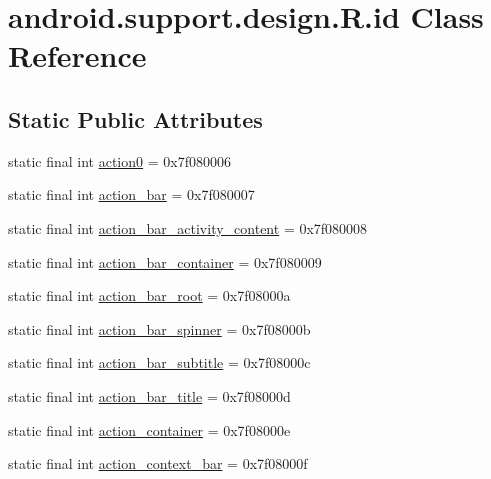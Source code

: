 \hypertarget{classandroid_1_1support_1_1design_1_1_r_1_1id}{}\section{android.\+support.\+design.\+R.\+id Class Reference}
\label{classandroid_1_1support_1_1design_1_1_r_1_1id}
\subsection*{Static Public Attributes}
\begin{DoxyCompactItemize}
\item 
static final int \mbox{\hyperlink{classandroid_1_1support_1_1design_1_1_r_1_1id_a65ca78d6559d5c73324d48f61d2af87e}{action0}} = 0x7f080006
\item 
static final int \mbox{\hyperlink{classandroid_1_1support_1_1design_1_1_r_1_1id_a244052aff1f9058e9de1c6c346d3843e}{action\+\_\+bar}} = 0x7f080007
\item 
static final int \mbox{\hyperlink{classandroid_1_1support_1_1design_1_1_r_1_1id_ad64ccac77799d29737c02c55d580556d}{action\+\_\+bar\+\_\+activity\+\_\+content}} = 0x7f080008
\item 
static final int \mbox{\hyperlink{classandroid_1_1support_1_1design_1_1_r_1_1id_a61d2f497f300510b00f9f341cfb3c078}{action\+\_\+bar\+\_\+container}} = 0x7f080009
\item 
static final int \mbox{\hyperlink{classandroid_1_1support_1_1design_1_1_r_1_1id_a8601162f3d020a91d67ad13ba68f61d9}{action\+\_\+bar\+\_\+root}} = 0x7f08000a
\item 
static final int \mbox{\hyperlink{classandroid_1_1support_1_1design_1_1_r_1_1id_aef2b62b7a707c8bcf579d09add314db0}{action\+\_\+bar\+\_\+spinner}} = 0x7f08000b
\item 
static final int \mbox{\hyperlink{classandroid_1_1support_1_1design_1_1_r_1_1id_a9d10452d08435f3bd9519b8254b65800}{action\+\_\+bar\+\_\+subtitle}} = 0x7f08000c
\item 
static final int \mbox{\hyperlink{classandroid_1_1support_1_1design_1_1_r_1_1id_a8f869c4a3c2a13ce56c526546d038ba0}{action\+\_\+bar\+\_\+title}} = 0x7f08000d
\item 
static final int \mbox{\hyperlink{classandroid_1_1support_1_1design_1_1_r_1_1id_ab87867f9ab8c5be2e341414488e0c9aa}{action\+\_\+container}} = 0x7f08000e
\item 
static final int \mbox{\hyperlink{classandroid_1_1support_1_1design_1_1_r_1_1id_a37ca1938da776943c7ff7018931ab832}{action\+\_\+context\+\_\+bar}} = 0x7f08000f

\end{DoxyCompactItemize}
